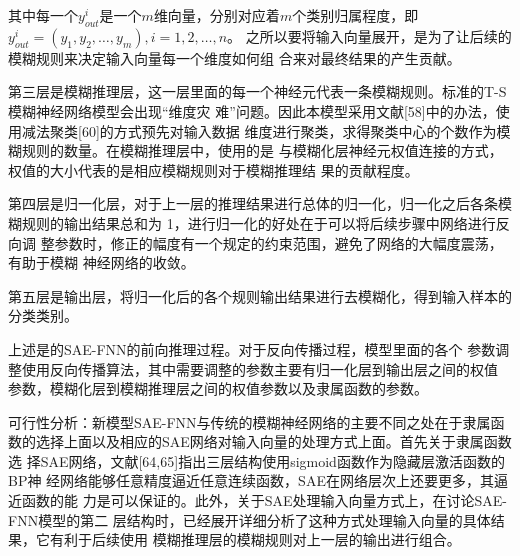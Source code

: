 \documentclass[12pt, a4paper]{article}
\begin{document}
其中每一个$y_{out}^{i}$是一个$m$维向量，分别对应着$m$个类别归属程度，即
$y_{out}^{i}=(y_1, y_2,\ldots, y_m), i=1,2,\ldots,n$。
之所以要将输入向量展开，是为了让后续的模糊规则来决定输入向量每一个维度如何组
合来对最终结果的产生贡献。
\par
第三层是模糊推理层，这一层里面的每一个神经元代表一条模糊规则。标准的T-S模糊神经网络模型会出现“维度灾
难”问题。因此本模型采用文献[58]中的办法，使用减法聚类[60]的方式预先对输入数据
维度进行聚类，求得聚类中心的个数作为模糊规则的数量。在模糊推理层中，使用的是
与模糊化层神经元权值连接的方式，权值的大小代表的是相应模糊规则对于模糊推理结
果的贡献程度。
\par
第四层是归一化层，对于上一层的推理结果进行总体的归一化，归一化之后各条模
糊规则的输出结果总和为 1，进行归一化的好处在于可以将后续步骤中网络进行反向调
整参数时，修正的幅度有一个规定的约束范围，避免了网络的大幅度震荡，有助于模糊
神经网络的收敛。
\par
第五层是输出层，将归一化后的各个规则输出结果进行去模糊化，得到输入样本的
分类类别。
\par
上述是的SAE-FNN的前向推理过程。对于反向传播过程，模型里面的各个
参数调整使用反向传播算法，其中需要调整的参数主要有归一化层到输出层之间的权值
参数，模糊化层到模糊推理层之间的权值参数以及隶属函数的参数。
\par
可行性分析：新模型SAE-FNN与传统的模糊神经网络的主要不同之处在于隶属函
数的选择上面以及相应的SAE网络对输入向量的处理方式上面。首先关于隶属函数选
择SAE网络，文献[64,65]指出三层结构使用sigmoid函数作为隐藏层激活函数的BP神
经网络能够任意精度逼近任意连续函数，SAE在网络层次上还要更多，其逼近函数的能
力是可以保证的。此外，关于SAE处理输入向量方式上，在讨论SAE-FNN模型的第二
层结构时，已经展开详细分析了这种方式处理输入向量的具体结果，它有利于后续使用
模糊推理层的模糊规则对上一层的输出进行组合。
\end{document}
